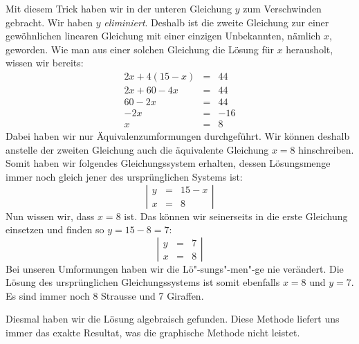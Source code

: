 \documentclass[%
11pt,%
twoside,%
titlepage,%
german,%
]{scrartcl}
\newenvironment{system}{\begin{displaymath}
  \left| 
    \begin{array}{rcl}}{\end{array} \right| 
\end{displaymath}}
\begin{document}
Mit diesem Trick haben wir in der unteren Gleichung $y$ zum Verschwinden gebracht. Wir haben $y$ \emph{eliminiert}. Deshalb ist die zweite Gleichung zur einer gew\"ohnlichen linearen Gleichung mit einer einzigen Unbekannten, n\"amlich $x$, geworden. Wie man aus einer solchen Gleichung die L\"osung f\"ur $x$ herausholt, wissen wir bereits:
\begin{eqnarray*}
  2x+4(15-x) & = & 44 \\
  2x+60-4x & = & 44 \\
  60-2x & = & 44 \\
  -2x & = & -16 \\
  x & = & 8
\end{eqnarray*}
Dabei haben wir nur \"Aquivalenzumformungen durchgef\"uhrt. Wir k\"onnen deshalb anstelle der zweiten Gleichung auch die \"aquivalente Gleichung $x=8$ hinschreiben. Somit haben wir folgendes Gleichungssystem erhalten, dessen L\"osungsmenge immer noch gleich jener des urspr\"unglichen Systems ist:
\begin{system}
  y & = & 15-x \\
  x & = & 8
\end{system}Nun wissen wir, dass $x=8$ ist. Das k\"onnen wir seinerseits in die erste Gleichung einsetzen und finden so $y=15-8=7$:
\begin{system}
  y & = & 7 \\
  x & = & 8
\end{system}Bei unseren Umformungen haben wir die L\"o"-sungs"-men"-ge nie ver\"andert. Die L\"osung des urspr\"unglichen Gleichungssystems ist somit ebenfalls $x=8$ und $y=7$. Es sind immer noch 8 Strausse und 7 Giraffen.

Diesmal haben wir die L\"osung algebraisch gefunden. Diese Methode liefert uns immer das exakte Resultat, was die graphische Methode nicht leistet.
\end{document}
